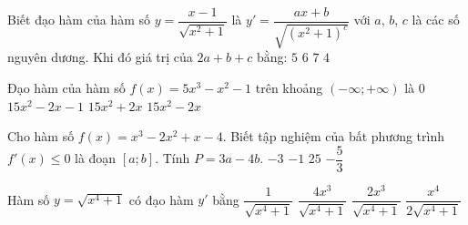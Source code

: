 \begin{ex}%
	Biết đạo hàm của hàm số $y=\dfrac{x-1}{\sqrt{x^{2}+1}}$ là $y'=\dfrac{ax+b}{\sqrt{\left(x^{2}+1\right)^{c}}}$ với $a$, $b$, $c$ là các số nguyên dương. Khi đó giá trị của $2a+b+c$ bằng: 
	\choice 
		 {$5$}
		 {\True $6$}
		{$7$} 
		{$4$} 
\end{ex}

\begin{ex}%
	Đạo hàm của hàm số $f(x)=5x^3-x^2-1$ trên khoảng $(-\infty;+\infty)$ là 
	 \choice
		{$0$} 
		{$15x^2-2x-1$} 
		 {$15x^2+2x$}
		{\True $15x^2-2x$} 
\end{ex}

\begin{ex}%
	Cho hàm số $f(x)=x^3-2x^2+x-4$. Biết tập nghiệm của bất phương  trình $f'(x)\le 0$ là đoạn $[a;b]$. Tính $P=3a-4b$.
	\choice 
		 {\True $ -3 $}
		{$ -1  $}
		{$  25 $}
		{$  -\dfrac{5}{3} $}
\end{ex}

\begin{ex}%
	Hàm số $y=\sqrt{x^4+1}$ có đạo  hàm $y'$ bằng
	\choice 
		{$\dfrac{1}{\sqrt{x^4+1}}$} 
		{$\dfrac{4x^3}{\sqrt{x^4+1}}$} 
		{\True  $\dfrac{2x^3}{\sqrt{x^4+1}}$}
		 {$\dfrac{x^4}{2\sqrt{x^4+1}}$}
\end{ex}


